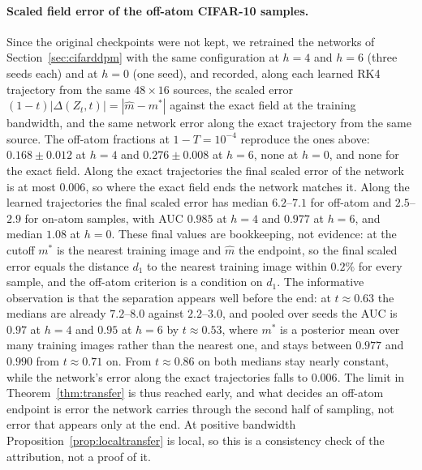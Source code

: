 \documentclass{article} %
\theoremstyle{plain}
\theoremstyle{definition}
\theoremstyle{remark}
\begin{document}
\paragraph{Scaled field error of the off-atom CIFAR-10 samples.} Since the original checkpoints
were not kept, we retrained the networks of Section~\ref{sec:cifarddpm} with the same
configuration at $h=4$ and $h=6$ (three seeds each) and at $h=0$ (one seed), and recorded, along
each learned RK4 trajectory from the same $48\times16$ sources, the scaled error
$(1-t)|\Delta(Z_t,t)|=|\hat m-m^*|$ against the exact field at the training bandwidth, and the
same network error along the exact trajectory from the same source. The
off-atom fractions at $1-T=10^{-4}$ reproduce the ones above: $0.168\pm0.012$ at $h=4$ and
$0.276\pm0.008$ at $h=6$, none at $h=0$, and none for the exact field. Along the exact
trajectories the final scaled error of the network is at most $0.006$, so where the exact field
ends the network matches it. Along the learned trajectories the final scaled error has median
$6.2$--$7.1$ for off-atom and $2.5$--$2.9$ for on-atom samples, with AUC $0.985$ at $h=4$ and
$0.977$ at $h=6$, and median $1.08$ at $h=0$. These final values are bookkeeping, not evidence: at
the cutoff $m^*$ is the nearest training image and $\hat m$ the endpoint, so the final scaled error
equals the distance $d_1$ to the nearest training image within $0.2\%$ for every sample, and the
off-atom criterion is a condition on $d_1$. The informative observation is that the separation
appears well before the end: at $t\approx0.63$ the medians are already $7.2$--$8.0$ against
$2.2$--$3.0$, and pooled over seeds the AUC is $0.97$ at $h=4$ and $0.95$ at $h=6$ by
$t\approx0.53$, where $m^*$ is a posterior mean over many training images rather than the nearest
one, and stays between $0.977$ and $0.990$ from $t\approx0.71$ on. From $t\approx0.86$ on both
medians stay nearly constant, while the network's error along the exact trajectories falls to
$0.006$. The limit in Theorem~\ref{thm:transfer} is thus reached early, and what decides an
off-atom endpoint is error the network carries through the second half of sampling, not error that
appears only at the end. At positive bandwidth Proposition~\ref{prop:localtransfer} is local, so
this is a consistency check of the attribution, not a proof of it.
\end{document}
